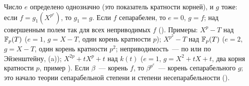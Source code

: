 Число $e$ определено однозначно (это показатель кратности корней), и $g$ тоже: если $f=g_1(X^{p^{e}})$, то $g_1=g$.
Если $f$ сепарабелен, то $e=0$, $g=f$; над совершенным полем так для всех неприводимых $f$ (). Примеры:
$X^p-T$ над $\mathbb F_p(T)$ ($e=1$, $g=X-T$, один корень кратности $p$); $X^{p^2}-T$ над $\mathbb F_p(T)$ ($e=2$, $g=X-T$, один
корень кратности $p^2$; неприводимость~--- по  или по Эйзенштейну, (a)); $X^{2p}+tX^p+t$ над $k(t)$
($e=1$, $g=X^2+tX+t$, два корня кратности $p$, пример ). Если $\beta$~--- корень $f$, то $\beta^{p^e}$~---
корень сепарабельного $g$; это начало теории сепарабельной степени и степени несепарабельности ().
